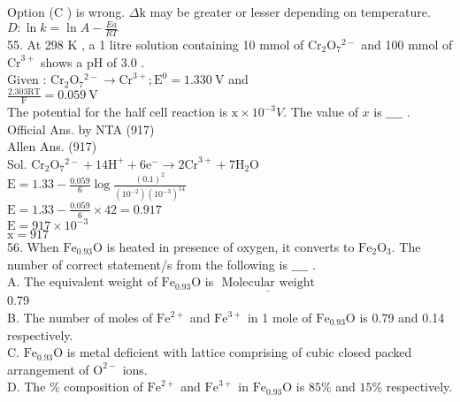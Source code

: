 \documentclass[10pt]{article}
\begin{document}
Option (C ) is wrong. \(\Delta \mathrm{k}\) may be greater or lesser depending on temperature.\\
\(D: \ln k=\ln A-\frac{E a}{R T}\)\\
55. At 298 K , a 1 litre solution containing 10 mmol of \(\mathrm{Cr}_{2} \mathrm{O}_{7}{ }^{2-}\) and 100 mmol of \(\mathrm{Cr}^{3+}\) shows a pH of 3.0 .\\
Given : \(\mathrm{Cr}_{2} \mathrm{O}_{7}{ }^{2-} \rightarrow \mathrm{Cr}^{3+} ; \mathrm{E}^{0}=1.330 \mathrm{~V}\) and\\
\(\frac{2.303 \mathrm{RT}}{\mathrm{F}}=0.059 \mathrm{~V}\)\\
The potential for the half cell reaction is \(\mathrm{x} \times 10^{-3} V\). The value of \(x\) is \(\_\_\_\_\) .\\
Official Ans. by NTA (917)\\
Allen Ans. (917)\\
Sol. \(\mathrm{Cr}_{2} \mathrm{O}_{7}{ }^{2-}+14 \mathrm{H}^{+}+6 \mathrm{e}^{-} \rightarrow 2 \mathrm{Cr}^{3+}+7 \mathrm{H}_{2} \mathrm{O}\)\\
\(\mathrm{E}=1.33-\frac{0.059}{6} \log \frac{(0.1)^{2}}{\left(10^{-2}\right)\left(10^{-3}\right)^{14}}\)\\
\(\mathrm{E}=1.33-\frac{0.059}{6} \times 42=0.917\)\\
\(\mathrm{E}=917 \times 10^{-3}\)\\
\(\mathrm{x}=917\)\\
56. When \(\mathrm{Fe}_{0.93} \mathrm{O}\) is heated in presence of oxygen, it converts to \(\mathrm{Fe}_{2} \mathrm{O}_{3}\). The number of correct statement/s from the following is \(\_\_\_\_\) .\\
A. The equivalent weight of \(\mathrm{Fe}_{0.93} \mathrm{O}\) is \(\underline{\text { Molecular weight }}\)\\
0.79\\
B. The number of moles of \(\mathrm{Fe}^{2+}\) and \(\mathrm{Fe}^{3+}\) in 1 mole of \(\mathrm{Fe}_{0.93} \mathrm{O}\) is 0.79 and 0.14 respectively.\\
C. \(\mathrm{Fe}_{0.93} \mathrm{O}\) is metal deficient with lattice comprising of cubic closed packed arrangement of \(\mathrm{O}^{2-}\) ions.\\
D. The \% composition of \(\mathrm{Fe}^{2+}\) and \(\mathrm{Fe}^{3+}\) in \(\mathrm{Fe}_{0.93} \mathrm{O}\) is \(85 \%\) and \(15 \%\) respectively.
\end{document}
